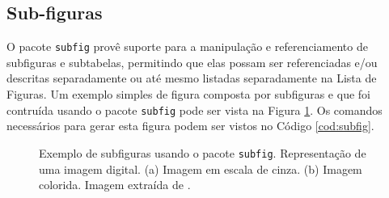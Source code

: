 \subsection{Sub-figuras}

O pacote \texttt{subfig} provê suporte para a manipulação e referenciamento de subfiguras e subtabelas, permitindo que elas possam ser referenciadas e/ou descritas separadamente ou até mesmo listadas separadamente na Lista de Figuras. Um exemplo simples de figura composta por subfiguras e que foi contruída usando o pacote \texttt{subfig} pode ser vista na Figura \ref{fig:subfig}. Os comandos necessários para gerar esta figura podem ser vistos no Código \ref{cod:subfig}.

\begin{figure}[ht]
    \centering
    \caption{Exemplo de subfiguras usando o pacote \texttt{subfig}. Representação de uma imagem digital. (a) Imagem em escala de cinza. (b) Imagem colorida. Imagem extraída de \parencite{Barbosa2020}.}
    \label{fig:subfig}
\end{figure}

